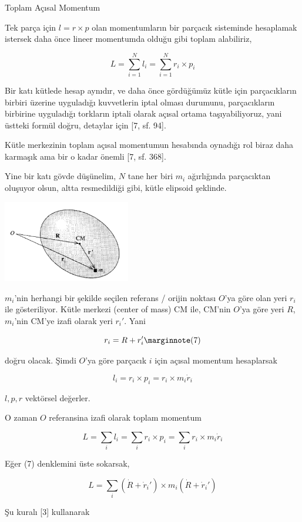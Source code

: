 \documentclass[12pt,fleqn]{article}\usepackage{../../common}
\begin{document}
Toplam Açısal Momentum

Tek parça için $l = r \times p$ olan momentumların bir parçacık sisteminde
hesaplamak istersek daha önce lineer momentumda olduğu gibi toplam alabiliriz,

$$
L = \sum_{i=1}^{N} l_i = \sum_{i=1}^{N} r_i \times p_i
$$

Bir katı kütlede hesap aynıdır, ve daha önce gördüğümüz kütle için parçacıkların
birbiri üzerine uyguladığı kuvvetlerin iptal olması durumunu, parçacıkların
birbirine uyguladığı torkların iptali olarak açısal ortama taşıyabiliyoruz, yani
üstteki formül doğru, detaylar için [7, sf. 94].

Kütle merkezinin toplam açısal momentumun hesabında oynadığı rol biraz daha
karmaşık ama bir o kadar önemli [7, sf. 368].

Yine bir katı gövde düşünelim, $N$ tane her biri $m_i$ ağırlığında parçacıktan
oluşuyor olsun, altta resmedildiği gibi, kütle elipsoid şeklinde.

\includegraphics[width=15em]{phy_005_basics_09.png}

$m_i$'nin herhangi bir şekilde seçilen referans / orijin noktası $O$'ya göre
olan yeri $r_i$ ile gösteriliyor. Kütle merkezi (center of mass) CM ile,
CM'nin $O$'ya göre yeri $R$, $m_i$'nin CM'ye izafi olarak yeri $r_i'$. Yani

$$
r_i = R + r_i'
\mlabel{7}
$$

doğru olacak. Şimdi $O$'ya göre parçacık $i$ için açısal momentum hesaplarsak

$$
l_i = r_i \times p_i = r_i \times m_i \dot{r}_i
$$

$l,p,r$ vektörsel değerler.

O zaman $O$ referansina izafi olarak toplam momentum

$$
L = \sum_i l_i = \sum_i r_i \times p_i = \sum_i r_i \times m_i \dot{r}_i
$$

Eğer (7) denklemini üste sokarsak,

$$
L = \sum_i (\dot{R} + \dot{r}_i') \times m_i (\dot{R} + \dot{r}_i' )
$$

Şu kuralı [3] kullanarak
\end{document}
